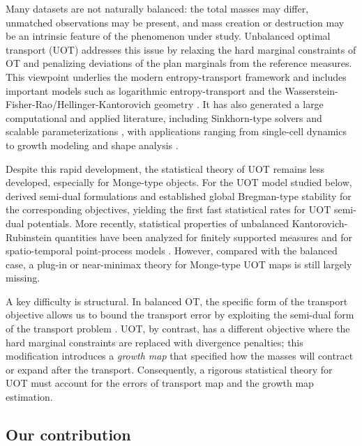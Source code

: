 \documentclass[11pt,reqno]{amsart}
\theoremstyle{definition}
\begin{document}
Many datasets are not naturally balanced: the total masses may differ, unmatched observations may be present, and mass creation or destruction may be an intrinsic feature of the phenomenon under study. Unbalanced optimal transport (UOT) addresses this issue by relaxing the hard marginal constraints of OT and penalizing deviations of the plan marginals from the reference measures. This viewpoint underlies the modern entropy-transport framework and includes important models such as logarithmic entropy-transport and the Wasserstein-Fisher-Rao/Hellinger-Kantorovich geometry \cite{ChizatEtAl2018,LieroMielkeSavare2018,savare2024relaxation,gallouet2025regularity}. It has also generated a large computational and applied literature, including Sinkhorn-type solvers and scalable parameterizations \cite{pham2020sinkhorn,sejourne2022faster,Gazdieva2024,yang2018scalable}, with applications ranging from single-cell dynamics to growth modeling and shape analysis \cite{schiebinger2019,sha2023cell,dimarino2020,bauer2022SRNF}.

Despite this rapid development, the statistical theory of UOT remains less developed, especially for Monge-type objects. For the UOT model studied below, \cite{vacher2022stability,vacher2023semi} derived semi-dual formulations and established global Bregman-type stability for the corresponding objectives, yielding the first fast statistical rates for UOT semi-dual potentials. More recently, statistical properties of unbalanced Kantorovich-Rubinstein quantities have been analyzed for finitely supported measures and for spatio-temporal point-process models \cite{HundrieserEtAl2025,struleva2025sharp}. However, compared with the balanced case, a plug-in or near-minimax theory for Monge-type UOT maps is still largely missing.

A key difficulty is structural. In balanced OT, the specific form of the transport objective allows us to bound the transport error by exploiting the semi-dual form of the transport problem \cite{hutter2021minimax,manole2024plugin,balakrishnan2025stability}. UOT, by contrast, has a different objective where the hard marginal constraints are replaced with divergence penalties; this modification introduces a \emph{growth map} that specified how the masses will contract or expand after the transport.
Consequently, a rigorous statistical theory for UOT must account for the errors of transport map and the growth map estimation.

\subsection{Our contribution}
\end{document}
